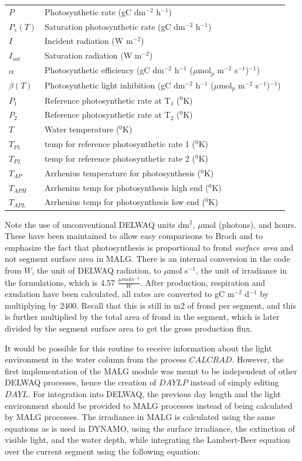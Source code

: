 \documentclass{deltares_manual}
\begin{document}
\begin{tabular}{ll}
$P$ & Photosynthetic rate (gC dm$^{-2}$ h$^{-1}$)\\
$P_s(T)$ & Saturation photosynthetic rate (gC dm$^{-2}$ h$^{-1}$)\\
$I$ & Incident radiation (W m$^{-2}$)\\
$I_{sat}$ & Saturation radiation (W m$^{-2}$)\\
$\alpha$ & Photosynthetic efficiency (gC dm$^{-2}$ h$^{-1}$ ($\mu$mol$_{p}$ m$^{-2}$ s$^{-1}$)$^{-1}$) \\
$\beta(T)$ & Photosynthetic light inhibition (gC dm$^{-2}$ h$^{-1}$ ($\mu$mol$_{p}$ m$^{-2}$ s$^{-1}$)$^{-1}$) \\
$P_1$ & Reference photosynthetic rate at T$_1$ ($^{0}$K)\\
$P_2$ & Reference photosynthetic rate at T$_2$ ($^{0}$K)\\
$T$ & Water temperature ($^{0}$K)\\
$T_{P1}$ & temp for reference photosynthetic rate 1 ($^{0}$K)\\
$T_{P2}$ & temp for reference photosynthetic rate 2	($^{0}$K)\\
$T_{AP}$ & Arrhenius temperature for photosynthesis ($^{0}$K)\\
$T_{APH}$ & Arrhenius temp for photosynthesis high end ($^{0}$K)\\
$T_{APL}$ & Arrhenius temp for photosynthesis low end ($^{0}$K)\\
\end{tabular}

Note the use of unconventional DELWAQ units dm$^{2}$, $\mu$mol (photons), and hours. These have been maintained to allow easy comparisons to Broch and to emphasize the fact that photosynthesis is proportional to frond \textit{surface area} and not segment surface area in MALG. There is an internal conversion in the code from $W$, the unit of DELWAQ radiation, to $\mu$mol s$^{-1}$, the unit of irradiance in the formulations, which is 4.57 $\frac{\mu mol s^{-1}}{W}$. After production, respiration and exudation have been calculated, all rates are converted to gC m$^{-2}$ d$^{-1}$ by multiplying by 2400. Recall that this is still in m2 of frond per segment, and this is further multiplied by the total area of frond in the segment, which is later divided by the segment surface area to get the gross production flux.

It would be possible for this routine to receive information about the light environment in the water column from the process $CALCRAD$. However, the first implementation of the MALG module was meant to be independent of other DELWAQ processes, hence the creation of $DAYLP$ instead of simply editing $DAYL$. For integration into DELWAQ, the previous day length and the light environment should be provided to MALG processes instead of being calculated by MALG processes. The irradiance in MALG is calculated using the same equations as is used in DYNAMO, using the surface irradiance, the extinction of visible light, and the water depth, while integrating the Lambert-Beer equation over the current segment using the following equation:
\end{document}
